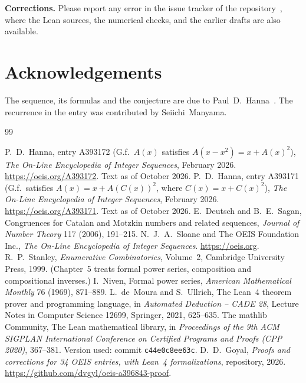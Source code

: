 \documentclass[11pt,a4paper]{article}
\theoremstyle{definition}
\theoremstyle{remark}
\newcommand{\para}[1]{\par\medskip\noindent\textbf{#1}\enspace}
\begin{document}
\para{Corrections.} Please report any error in the issue tracker of the repository~\cite{repo}, where the Lean
sources, the numerical checks, and the earlier drafts are also available.

\section*{Acknowledgements}
The sequence, its formulas and the conjecture are due to Paul~D.~Hanna~\cite{oeis}. The recurrence in the entry was
contributed by Seiichi~Manyama.

\begin{thebibliography}{99}\small
\raggedright
{} P.~D.~Hanna, entry A393172 (G.f.\ $A(x)$ satisfies $A(x-x^2)=x+A(x)^2$), \emph{The On-Line Encyclopedia of Integer Sequences}, February 2026. \url{https://oeis.org/A393172}. Text as of October 2026.
 P.~D.~Hanna, entry A393171 (G.f.\ satisfies $A(x)=x+A(C(x))^2$, where $C(x)=x+C(x)^2$), \emph{The On-Line Encyclopedia of Integer Sequences}, February 2026. \url{https://oeis.org/A393171}. Text as of October 2026.
 E.~Deutsch and B.~E.~Sagan, Congruences for Catalan and Motzkin numbers and related sequences, \emph{Journal of Number Theory} 117 (2006), 191--215.
 N.~J.~A.~Sloane and The OEIS Foundation Inc., \emph{The On-Line Encyclopedia of Integer Sequences}. \url{https://oeis.org}.
 R.~P.~Stanley, \emph{Enumerative Combinatorics}, Volume~2, Cambridge University Press, 1999. (Chapter~5 treats formal power series, composition and compositional inverses.)
 I.~Niven, Formal power series, \emph{American Mathematical Monthly} 76 (1969), 871--889.
 L.~de~Moura and S.~Ullrich, The Lean~4 theorem prover and programming language, in \emph{Automated Deduction -- CADE 28}, Lecture Notes in Computer Science 12699, Springer, 2021, 625--635.
 The mathlib Community, The Lean mathematical library, in \emph{Proceedings of the 9th ACM SIGPLAN International Conference on Certified Programs and Proofs (CPP 2020)}, 367--381. Version used: commit \texttt{c44e0c8ee63c}.
 D.~D.~Goyal, \emph{Proofs and corrections for 34 OEIS entries, with Lean~4 formalizations}, repository, 2026. \url{https://github.com/dvgyl/oeis-a396843-proof}.
\end{thebibliography}
\end{document}
